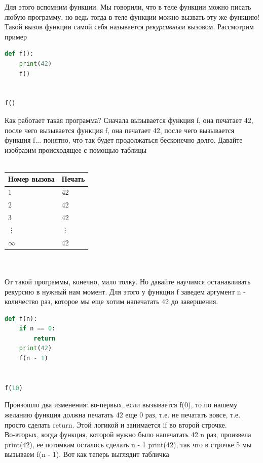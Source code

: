 \documentclass[12pt]{article} %
\begin{document}
Для этого вспомним функции. Мы говорили, что в теле функции можно писать любую программу, но ведь тогда в теле функции можно вызвать эту же функцию! Такой вызов функции самой себя называется \textit{рекурсивным} вызовом. Рассмотрим пример
\begin{lstlisting}[language=Python]
def f():
	print(42)
	f()
	

f()
\end{lstlisting}
Как работает такая программа? Сначала вызывается функция \colorbox{codegray}{f}, она печатает 42, после чего вызывается функция \colorbox{codegray}{f}, она печатает 42, после чего вызывается функция \colorbox{codegray}{f}... понятно, что так будет продолжаться бесконечно долго. Давайте изобразим происходящее с помощью таблицы\\
\\
\begin{tabular}{|l|l|}
	\hline
	Номер вызова & Печать \\
	\hline
	1 & 42 \\
	\hline
	2 & 42 \\
	\hline
	3 & 42 \\
	\hline
	\vdots & \vdots \\
	\hline
	$\infty$ & 42 \\
	\hline
\end{tabular}\\
\\
От такой программы, конечно, мало толку. Но давайте научимся останавливать рекурсию в нужный нам момент. Для этого у функции \colorbox{codegray}{f} заведем аргумент \colorbox{codegray}{n} - количество раз, которое мы еще хотим напечатать 42 до завершения.
\begin{lstlisting}[language=Python]
def f(n):
	if n == 0:
		return
	print(42)
	f(n - 1)


f(10)
\end{lstlisting}
Произошло два изменения: во-первых, если вызывается \colorbox{codegray}{f(0)}, то по нашему желанию функция должна печатать 42 еще 0 раз, т.е. не печатать вовсе, т.е. просто сделать \colorbox{codegray}{\textcolor{codepurple}{return}}. Этой логикой и занимается \colorbox{codegray}{\textcolor{codepurple}{if}} во второй строчке.\\
Во-вторых, когда функция, которой нужно было напечатать 42 n раз, произвела \colorbox{codegray}{\textcolor{codepurple}{print}(42)}, ее потомкам осталось сделать n - 1 \colorbox{codegray}{\textcolor{codepurple}{print}(42)}, так что в строчке 5 мы вызываем \colorbox{codegray}{f(n - 1)}. Вот как теперь выглядит табличка\\
\end{document}
